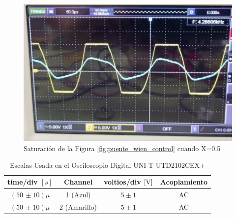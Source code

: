             \begin{figure}[H]
                \centering
                \renewcommand{\figurename}{Imagen}
                \includegraphics[width=15cm]{Imagenes/exp_puente_wien_sc5.png}
                \caption{Saturación de la Figura \ref{fig:puente_wien_control} cuando X=0.5}
                \label{fig:exp_puente_wien_sc5}
            \end{figure}

            \begin{table}[H]
                \centering
                \begin{tabular}{|c|c|c|c|}
                    \hline
                    \textbf{time/div} $[s]$ & \textbf{Channel} & \textbf{voltios/div $[\volt]$} & \textbf{Acoplamiento} \\ \hline
                    $(50 \, \pm 10) \mu  $ & 1 (Azul)  &   $5 \pm 1 $ & AC \\ \hline  
                    $(50 \, \pm 10) \mu  $ & 2 (Amarillo)  &   $5 \pm 1 $ & AC \\ \hline 
                \end{tabular}
                \caption{Escalas Usada en el Osciloscopio Digital UNI-T UTD2102CEX+}
                \label{tab:escala_puente_wien_sc5}
            \end{table}


